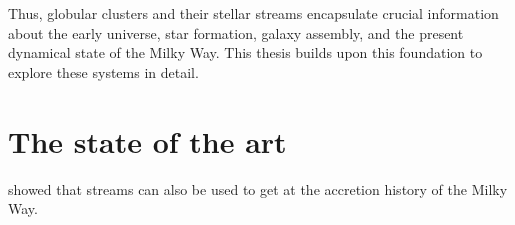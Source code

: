     Thus, globular clusters and their stellar streams encapsulate crucial information about the early universe, star formation, galaxy assembly, and the present dynamical state of the Milky Way. This thesis builds upon this foundation to explore these systems in detail.



\section{The state of the art}

\citet{2021ApJ...909L..26B} showed that streams can also be used to get at the accretion history of the Milky Way. 






